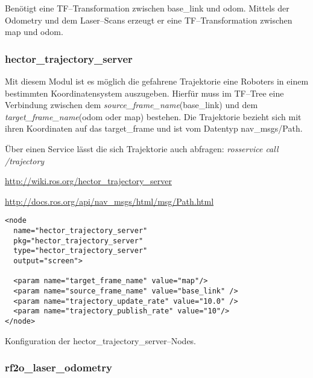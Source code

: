 Benötigt eine TF--Transformation zwischen base\_link und odom. Mittels der Odometry und dem Laser--Scans erzeugt er eine TF--Transformation zwischen map und odom.


\begin{comment}
------------------------------------------------------------------------------------------
\end{comment}
\subsubsection{hector\_trajectory\_server}

Mit diesem Modul ist es möglich die gefahrene Trajektorie eine Roboters in einem bestimmten Koordinatensystem auszugeben. Hierfür muss im TF--Tree eine Verbindung zwischen dem \textit{source\_frame\_name}(base\_link) und dem \textit{target\_frame\_name}(odom oder map) bestehen. Die Trajektorie bezieht sich mit ihren Koordinaten auf das target\_frame und ist vom Datentyp nav\_msgs/Path.

Über einen Service lässt die sich Trajektorie auch abfragen: \textit{rosservice call /trajectory}

\url{http://wiki.ros.org/hector_trajectory_server}

\url{http://docs.ros.org/api/nav_msgs/html/msg/Path.html}

\begin{listing}
	\begin{verbatim}
<node 
  name="hector_trajectory_server"
  pkg="hector_trajectory_server"
  type="hector_trajectory_server"
  output="screen">

  <param name="target_frame_name" value="map"/>
  <param name="source_frame_name" value="base_link" />
  <param name="trajectory_update_rate" value="10.0" />
  <param name="trajectory_publish_rate" value="10"/>
</node>
	\end{verbatim}
	\unskip
	\caption{Konfiguration der hector\_trajectory\_server--Nodes.}
	\label{lst:hector_trajectory_server_node}
\end{listing}


\begin{comment}
------------------------------------------------------------------------------------------
\end{comment}
\subsubsection{rf2o\_laser\_odometry}

